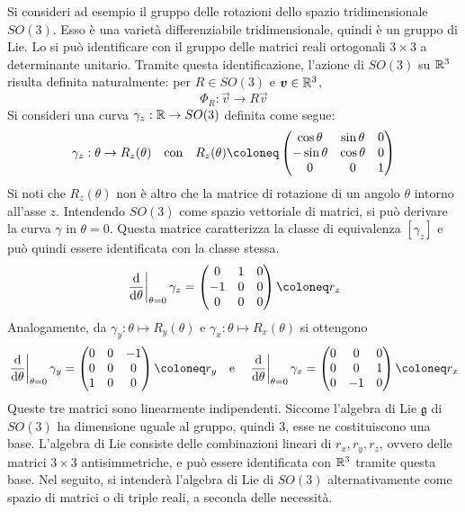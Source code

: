 Si consideri ad esempio il gruppo delle rotazioni dello spazio tridimensionale $SO(3)$. Esso è una varietà differenziabile tridimensionale, quindi è un gruppo di Lie. Lo si può identificare con il gruppo delle matrici reali ortogonali $3\times 3$ a determinante unitario. Tramite questa identificazione, l'azione di $SO(3)$ su $\mathbb{R}^3$ risulta definita naturalmente: per $R \in SO(3)$ e $\boldsymbol{v} \in \mathbb{R}^3$, 
\begin{equation}
\Phi_R: \vec{v}\to R\vec{v}
\end{equation} 
Si consideri una curva $\gamma_z: \mathbb{R} \to SO(3)$ definita come segue:
\begin{equation}
\gamma_z: \theta \to R_z(\theta) \qqtext{con} R_z(\theta) \defeq \pmqty{\cos \theta & \sin \theta & 0 \\ -\sin \theta & \cos \theta & 0 \\ 0 & 0 & 1}
\end{equation}
Si noti che $R_z(\theta)$ non è altro che la matrice di rotazione di un angolo $\theta$ intorno all'asse $z$. Intendendo $SO(3)$ come spazio vettoriale di matrici, si può derivare la curva $\gamma$ in $\theta=0$. Questa matrice caratterizza la classe di equivalenza $[\gamma_z]$ e può quindi essere identificata con la classe stessa. 
\begin{equation}
\eval{\dv{\theta}}_{\theta=0}\gamma_z = \pmqty{0 & 1 & 0 \\ -1 & 0 & 0 \\ 0 & 0 & 0} \defeq r_z
\end{equation}
Analogamente, da $\gamma_y: \theta\mapsto R_y(\theta)$ e $\gamma_x: \theta \mapsto R_x(\theta)$ si ottengono 
\begin{equation}
  \eval{\dv{\theta}}_{\theta=0}\gamma_y = \pmqty{0 & 0 & -1 \\ 0 & 0 & 0 \\ 1 & 0 & 0} \defeq r_y \qqtext{e} \eval{\dv{\theta}}_{\theta=0}\gamma_x = \pmqty{0 & 0 & 0 \\ 0 & 0 & 1 \\ 0 & -1 & 0} \defeq r_x
\end{equation}
Queste tre matrici sono linearmente indipendenti. Siccome l'algebra di Lie $\mathfrak{g}$ di $SO(3)$ ha dimensione uguale al gruppo, quindi $3$, esse ne costituiscono una base. L'algebra di Lie consiste delle combinazioni lineari di $r_x, r_y, r_z$, ovvero delle matrici $3\times 3$ antisimmetriche, e può essere identificata con $\mathbb{R}^3$ tramite questa base.  Nel seguito, si intenderà l'algebra di Lie di $SO(3)$ alternativamente come spazio di matrici o di triple reali, a seconda delle necessità.

